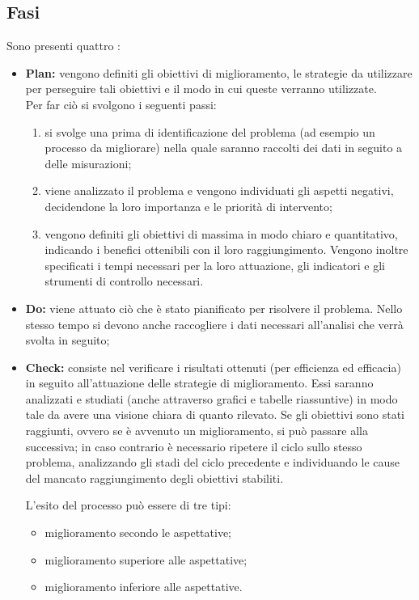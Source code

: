 \subsection{Fasi}
Sono presenti quattro :
\begin{itemize}
	\item  \textbf{Plan:} vengono definiti gli obiettivi di miglioramento, le strategie da utilizzare per perseguire tali obiettivi e il modo in cui queste verranno utilizzate. \\
	Per far ciò si svolgono i seguenti passi:
	\begin{enumerate}
		\item si svolge una prima  di identificazione del problema (ad esempio un processo da migliorare) nella quale saranno raccolti dei dati in seguito a delle misurazioni; 
		\item viene analizzato il problema e vengono individuati gli aspetti negativi, decidendone la loro importanza e le priorità di intervento;
		\item vengono definiti gli obiettivi di massima in modo chiaro e quantitativo, indicando i benefici ottenibili con il loro raggiungimento. Vengono inoltre specificati i tempi necessari per la loro attuazione, gli indicatori e gli strumenti di controllo necessari.
	\end{enumerate}
		
	
	\item  \textbf{Do:} viene attuato ciò che è stato pianificato per risolvere il problema. Nello stesso tempo si devono anche raccogliere i dati necessari all'analisi che verrà svolta in seguito;
	
	\item  \textbf{Check:} consiste nel verificare i risultati ottenuti (per efficienza ed efficacia) in seguito all'attuazione delle strategie di miglioramento. Essi saranno analizzati e studiati (anche attraverso grafici e tabelle riassuntive) in modo tale da avere una visione chiara di quanto rilevato. Se gli obiettivi sono stati raggiunti, ovvero se è avvenuto un miglioramento, si può passare alla  successiva; in caso contrario è necessario ripetere il ciclo  sullo stesso problema, analizzando gli stadi del ciclo precedente e individuando le cause del mancato raggiungimento degli obiettivi stabiliti.
	
	L'esito del processo può essere di tre tipi:
	\begin{itemize}
		\item miglioramento secondo le aspettative;
		\item miglioramento superiore alle aspettative;
		\item miglioramento inferiore alle aspettative.
	\end{itemize}



\end{itemize}
